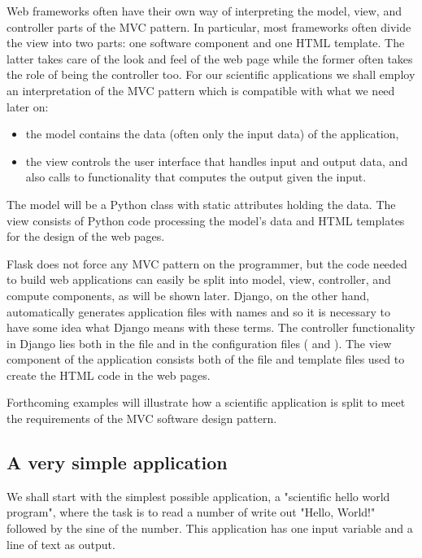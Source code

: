 \documentclass[%
oneside,                 %
final,                   %
10pt]{article}
\begin{document}
Web frameworks often have their own way of interpreting the
model, view, and controller parts of the MVC pattern.
In particular, most frameworks often divide the view into two parts:
one software component and one HTML template. The latter takes care
of the look and feel of the web page while the former often takes
the role of being the controller too.
For our scientific applications
we shall employ an interpretation of the MVC pattern
which is compatible with what we need later on:

\begin{itemize}
 \item the model contains the data (often only the input data) of the application,

 \item the view controls the user interface that handles input and output data,
   and also calls to functionality that computes the output given the input.
\end{itemize}

\noindent
The model will be a Python class with static attributes holding the data.
The view consists of Python code processing the model's data and HTML
templates for the design of the web pages.

Flask does not force any MVC pattern on the programmer, but
the code needed to build web applications can easily be split into
model, view, controller, and compute components, as will be shown later.
Django, on the other hand, automatically generates application files with names
 and  so it is
necessary to have some idea what Django means with these terms.
The controller functionality in Django lies both in the  file and
in the configuration
files ( and ). The view component of the application
consists both of the  file and template files used to create
the HTML code in the web pages.

Forthcoming examples will illustrate how a scientific application is
split to meet the requirements of the MVC software design pattern.

\subsection{A very simple application}



We shall start with the simplest possible application,
a "scientific hello world program", where the
task is to read a number of write out "Hello, World!" followed by
the sine of the number. This application has one input variable and
a line of text as output.
\end{document}

